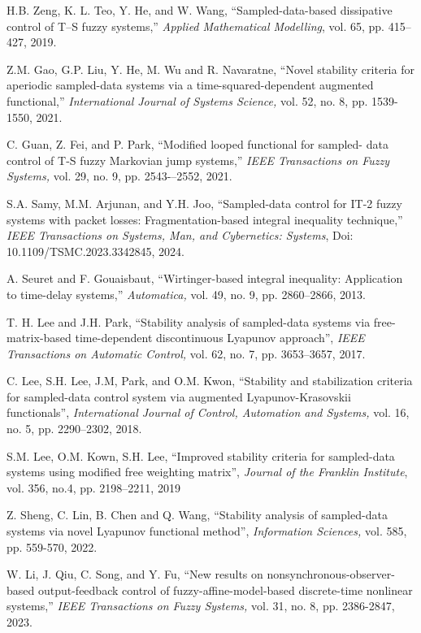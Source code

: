 \documentclass[preprint,11pt]{elsarticle}
\begin{document}
\begin{thebibliography}{00}
H.B. Zeng, K. L. Teo, Y. He, and W. Wang, ``Sampled-data-based dissipative control of T–S fuzzy systems,'' {\em  Applied Mathematical Modelling}, vol. 65,
pp. 415–427, 2019.

Z.M. Gao, G.P. Liu, Y. He, M. Wu and R. Navaratne, ``Novel stability criteria for aperiodic sampled-data systems via a time-squared-dependent augmented functional,'' {\em International Journal of Systems Science,} vol. 52, no. 8, pp. 1539-1550, 2021.

C. Guan, Z. Fei, and P. Park, ``Modified looped functional for sampled- data control of T-S fuzzy Markovian jump systems,'' {\em IEEE Transactions
on Fuzzy Systems,} vol. 29, no. 9, pp. 2543-–2552, 2021.

{S.A. Samy, M.M. Arjunan, and Y.H. Joo, ``Sampled-data control for IT-2 fuzzy systems with packet losses: Fragmentation-based integral inequality technique,'' {\em IEEE Transactions on Systems, Man, and Cybernetics: Systems}, Doi: 10.1109/TSMC.2023.3342845, 2024.}


A. Seuret and F. Gouaisbaut, ``Wirtinger-based integral inequality: Application to time-delay systems,'' {\em  Automatica,} vol. 49, no. 9, pp. 2860–2866, 2013.

T. H. Lee and J.H. Park, ``Stability analysis of sampled-data systems via free-matrix-based time-dependent discontinuous Lyapunov approach'', {\em IEEE Transactions
on Automatic Control,} vol. 62, no. 7, pp. 3653–3657, 2017.

C. Lee, S.H. Lee, J.M, Park, and O.M. Kwon,  ``Stability and stabilization criteria for sampled-data control system
via augmented Lyapunov-Krasovskii functionals'', {\em International Journal of Control, Automation and Systems,} vol. 16, no. 5, pp. 2290–2302, 2018.


S.M. Lee, O.M. Kown, S.H. Lee, ``Improved stability criteria for sampled-data systems using modified free weighting matrix'', {\em Journal of the Franklin Institute}, vol. 356, no.4, pp. 2198–2211, 2019


Z. Sheng, C. Lin, B. Chen and Q. Wang, ``Stability analysis of sampled-data systems via novel Lyapunov functional method'', {\em Information Sciences,} vol. 585,  pp. 559-570, 2022.

{W. Li, J. Qiu, C. Song, and Y. Fu, ``New results on nonsynchronous-observer-based output-feedback control of fuzzy-affine-model-based discrete-time nonlinear systems,'' {\em IEEE Transactions on Fuzzy Systems,} vol. 31, no. 8, pp. 2386-2847, 2023.}


\end{thebibliography}
\end{document}
